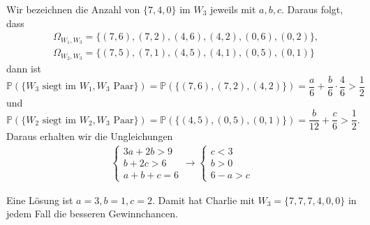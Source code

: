 \documentclass[fleqn,draft,a5paper]{article}
\theoremstyle{remark}
\begin{document}
Wir bezeichnen die Anzahl von \(\{7,4,0\}\) im \(W_{3}\) jeweils mit
\(a,b,c\).  Daraus folgt, dass
\begin{align*}
  &\Omega_{W_{1},W_{3}} = \{(7,6),(7,2),(4,6),(4,2),(0,6),(0,2)\}, \\
  &\Omega_{W_{2},W_{3}} = \{(7,5),(7,1),(4,5),(4,1),(0,5),(0,1)\}
\end{align*}
dann ist
\[\mathbb{P}(\{W_{3} \text{ siegt im } W_{1}, W_{3} \text{ Paar}\}) =
\mathbb{P}(\{(7,6),(7,2),(4,2)\}) = \frac{a}{6}+\frac{b}{6}\cdot\frac{4}{6} > \frac{1}{2}\]
und
\[\mathbb{P}(\{W_{2} \text{ siegt im } W_{2}, W_{3} \text{ Paar}\}) =
  \mathbb{P}(\{(4,5),(0,5),(0,1)\}) = \frac{b}{12}+\frac{c}{6} > \frac{1}{2}.\]
Daraus erhalten wir die Ungleichungen
\begin{align*}
  \begin{cases}
    3a+2b > 9 \\
    b+2c >6 \\
    a+b+c =6
  \end{cases}
  \to
  \begin{cases}
    c < 3 \\
    b > 0 \\
    6-a > c
  \end{cases}
\end{align*}

Eine Lösung ist \(a=3,b=1,c=2\). Damit hat Charlie mit
\(W_{3} = \{7,7,7,4,0,0\}\) in jedem Fall die besseren Gewinnchancen.
\end{document}
